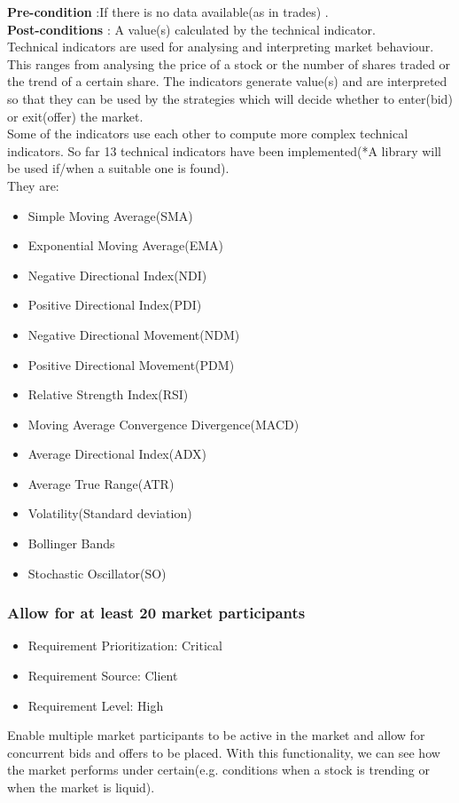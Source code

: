 \documentclass[12pt]{article}
\begin{document}
				\textbf{Pre-condition} :If there is no data available(as in trades) .\\
				\textbf{Post-conditions} : A value(s) calculated by the technical indicator.\\ 
						
				Technical indicators are used for analysing and interpreting market behaviour. This ranges from analysing the price of a stock or the number of shares traded or the trend of a certain share. The indicators generate value(s) and are interpreted so that they can be used by the strategies which will decide whether to enter(bid) or exit(offer) the market.\\
				Some of the indicators use each other to compute more complex technical indicators. So far 13 technical indicators have been implemented(*A library will be used if/when a suitable one is found).\\
				They are:
				\begin{itemize}
					\item Simple Moving Average(SMA)
					\item Exponential Moving Average(EMA)
					\item Negative Directional Index(NDI) 
					\item Positive Directional Index(PDI)
					\item Negative Directional Movement(NDM)
					\item Positive Directional Movement(PDM)
					\item Relative Strength Index(RSI)
					\item Moving Average Convergence Divergence(MACD)
					\item Average Directional Index(ADX)
					\item Average True Range(ATR)
					\item Volatility(Standard deviation)
					\item Bollinger Bands
					\item Stochastic Oscillator(SO)	
				\end{itemize} 								
				
				\subsubsection{Allow for at least 20 market participants}
				\begin{itemize}
					\item Requirement Prioritization: Critical
					\item Requirement Source: Client
					\item Requirement Level: High 	
				\end{itemize}
				Enable multiple market participants to be active in the market and allow for concurrent bids and offers to be placed. With this functionality, we can see how the market performs under certain(e.g. conditions when a stock is trending or when the market is liquid). \\
				
\end{document}
